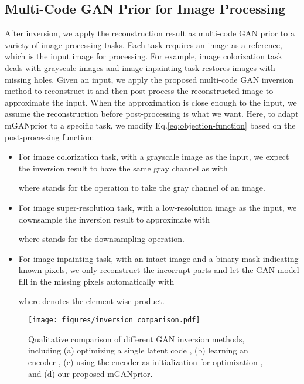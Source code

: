 \documentclass[10pt,twocolumn,letterpaper]{article}
\begin{document}
\subsection{Multi-Code GAN Prior for Image Processing}\label{subsec:gan-prior-for-image-processing}
After inversion, we apply the reconstruction result as multi-code GAN prior to a variety of image processing tasks.
Each task requires an image as a reference, which is the input image for processing.
For example, image colorization task deals with grayscale images and image inpainting task restores images with missing holes.
Given an input, we apply the proposed multi-code GAN inversion method to reconstruct it and then post-process the reconstructed image to approximate the input.
When the approximation is close enough to the input, we assume the reconstruction before post-processing is what we want.
Here, to adapt mGANprior to a specific task, we modify Eq.\eqref{eq:objection-function} based on the post-processing function:
\begin{itemize}
  \vspace{-2pt}
  \setlength{\itemsep}{2pt}
  \setlength{\parsep}{0pt}
  \setlength{\parskip}{0pt}

  \item For image colorization task, with a grayscale image  as the input, we expect the inversion result to have the same gray channel as  with

where  stands for the operation to take the gray channel of an image.

  \item For image super-resolution task, with a low-resolution image  as the input, we downsample the inversion result to approximate  with

where  stands for the downsampling operation.

  \item For image inpainting task, with an intact image  and a binary mask  indicating known pixels, we only reconstruct the incorrupt parts and let the GAN model fill in the missing pixels automatically with

where  denotes the element-wise product.

\end{itemize}


\begin{figure}[t]
  \centering
  \texttt{[image: figures/inversion\_comparison.pdf]}
  \vspace{-20pt}
  \captionsetup{font=small}
  \caption{
    Qualitative comparison of different GAN inversion methods, including (a) optimizing a single latent code \cite{invertibility}, (b) learning an encoder \cite{zhu2016generative}, (c) using the encoder as initialization for optimization \cite{inverting2019}, and (d) our proposed mGANprior.
  }
  \label{fig:inversion}
 \vspace{-12pt}
\end{figure}
\end{document}
